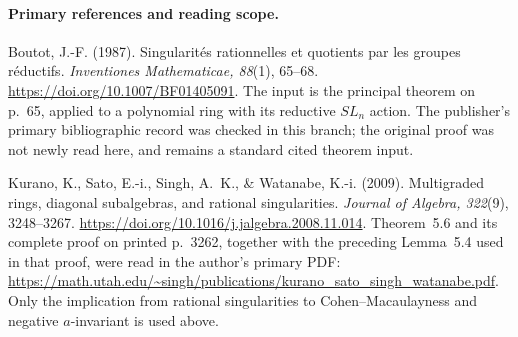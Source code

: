 \paragraph{Primary references and reading scope.}
Boutot, J.-F. (1987). Singularit\'es rationnelles et quotients par les
groupes r\'eductifs. \emph{Inventiones Mathematicae, 88}(1), 65--68.
\url{https://doi.org/10.1007/BF01405091}.
The input is the principal theorem on p.~65, applied to a polynomial
ring with its reductive $SL_n$ action. The publisher's primary
bibliographic record was checked in this branch; the original proof
was not newly read here, and remains a standard cited theorem input.

Kurano, K., Sato, E.-i., Singh, A.~K., \& Watanabe, K.-i. (2009).
Multigraded rings, diagonal subalgebras, and rational singularities.
\emph{Journal of Algebra, 322}(9), 3248--3267.
\url{https://doi.org/10.1016/j.jalgebra.2008.11.014}.
Theorem~5.6 and its complete proof on printed p.~3262, together with
the preceding Lemma~5.4 used in that proof, were read in the author's
primary PDF:
\url{https://math.utah.edu/~singh/publications/kurano_sato_singh_watanabe.pdf}.
Only the implication from rational singularities to Cohen--Macaulayness
and negative $a$-invariant is used above.
